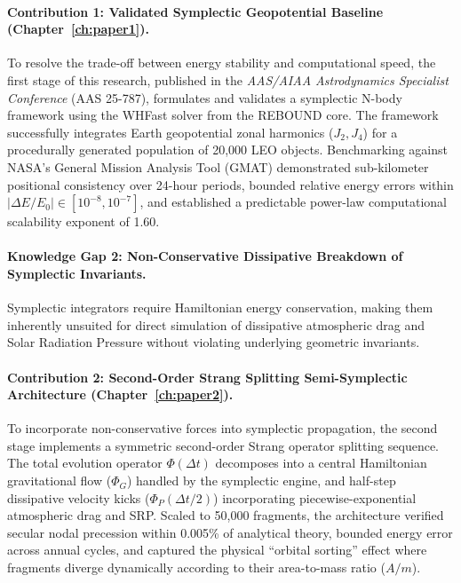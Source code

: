 \documentclass[12pt,letterpaper,twoside]{book}
\begin{document}
\paragraph{Contribution 1: Validated Symplectic Geopotential Baseline (Chapter~\ref{ch:paper1}).}
To resolve the trade-off between energy stability and computational speed, the first stage of this research, published in the \textit{AAS/AIAA Astrodynamics Specialist Conference} (AAS 25-787), formulates and validates a symplectic N-body framework using the WHFast solver from the REBOUND core. The framework successfully integrates Earth geopotential zonal harmonics ($J_2, J_4$) for a procedurally generated population of 20,000 LEO objects. Benchmarking against NASA's General Mission Analysis Tool (GMAT) demonstrated sub-kilometer positional consistency over 24-hour periods, bounded relative energy errors within $|\Delta E/E_0| \in [10^{-8}, 10^{-7}]$, and established a predictable power-law computational scalability exponent of 1.60.

\paragraph{Knowledge Gap 2: Non-Conservative Dissipative Breakdown of Symplectic Invariants.}
Symplectic integrators require Hamiltonian energy conservation, making them inherently unsuited for direct simulation of dissipative atmospheric drag and Solar Radiation Pressure without violating underlying geometric invariants.

\paragraph{Contribution 2: Second-Order Strang Splitting Semi-Symplectic Architecture (Chapter~\ref{ch:paper2}).}
To incorporate non-conservative forces into symplectic propagation, the second stage implements a symmetric second-order Strang operator splitting sequence. The total evolution operator $\Phi(\Delta t)$ decomposes into a central Hamiltonian gravitational flow ($\Phi_G$) handled by the symplectic engine, and half-step dissipative velocity kicks ($\Phi_P(\Delta t/2)$) incorporating piecewise-exponential atmospheric drag and SRP. Scaled to 50,000 fragments, the architecture verified secular nodal precession within 0.005\% of analytical theory, bounded energy error across annual cycles, and captured the physical ``orbital sorting'' effect where fragments diverge dynamically according to their area-to-mass ratio ($A/m$).
\end{document}
